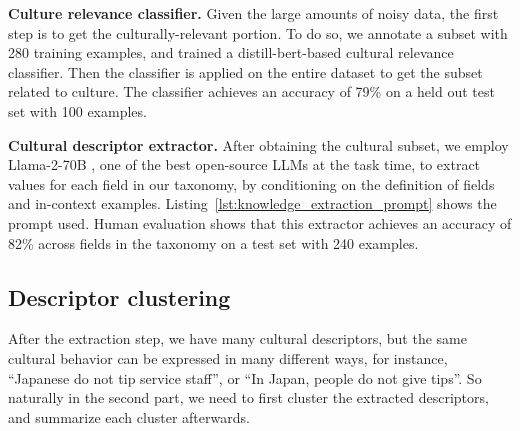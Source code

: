 \documentclass{article} %
\newcommand{\caleb}[1]{\textcolor{aqua}{[#1 --Caleb]}}
\begin{document}
\noindent\textbf{Culture relevance classifier.}
Given the large amounts of noisy data, the first step is to get the culturally-relevant portion. To do so, we annotate a subset with 280 training examples, and trained a distill-bert-based \citep{sanh2019distilbert} cultural relevance classifier. Then the classifier is applied on the entire dataset to get the subset related to culture. 
 The classifier achieves 
 an accuracy of 79\% on a held out test set with 100 examples.  

 

\noindent\textbf{Cultural descriptor extractor.}
After obtaining the cultural subset, we employ Llama-2-70B \citep{touvron2023llama}, one of the best open-source LLMs at the task time, to extract values for each field in our taxonomy, by conditioning on the definition of fields and in-context examples. Listing~\ref{lst:knowledge_extraction_prompt} shows the prompt used. Human evaluation shows that this extractor 
achieves an accuracy of 82\% across fields in the taxonomy on a test set with 240 examples. 








\vspace{-1em}
\subsection{Descriptor clustering}
After the extraction step, we have many cultural descriptors, but the same cultural behavior can be expressed in many different ways, for instance, ``Japanese do not tip service staff'', or ``In Japan, people do not give tips''. So naturally in the second part, we need to first cluster the extracted descriptors, and summarize each cluster afterwards. %
\end{document}
